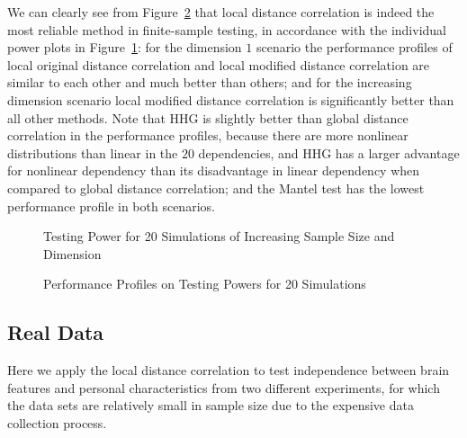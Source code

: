 \documentclass[12pt]{article}
\begin{document}
We can clearly see from Figure~\ref{figSim3} that local distance correlation is indeed the most reliable method in finite-sample testing, in accordance with the individual power plots in Figure~\ref{figSim1}: for the dimension $1$ scenario the performance profiles of local original distance correlation and local modified distance correlation are similar to each other and much better than others; and for the increasing dimension scenario local modified distance correlation is significantly better than all other methods. Note that HHG is slightly better than global distance correlation in the performance profiles, because there are more nonlinear distributions than linear in the $20$ dependencies, and HHG has a larger advantage for nonlinear dependency than its disadvantage in linear dependency when compared to global distance correlation; and the Mantel test has the lowest performance profile in both scenarios.

\begin{figure}[htbp]
\hfil
{}
\caption{Testing Power for 20 Simulations of Increasing Sample Size and Dimension}
\label{figSim1}
\end{figure}

\begin{comment}
\begin{figure}[htbp]
\subfloat[]{
\texttt{[image: Fig2]}
}
\hfil
\subfloat[]{
\texttt{[image: Fig6]}
}
\caption{Testing Power for 20 Simulations of Increasing Neighborhood at Fixed Sample Size and Dimension}
\label{figSim2}
\end{figure}
\end{comment}

\begin{figure}[htbp]
\hfil
{}
\caption{Performance Profiles on Testing Powers for 20 Simulations}
\label{figSim3}
\end{figure}

\subsection{Real Data}
\label{numer2}
Here we apply the local distance correlation to test independence between brain features and personal characteristics from two different experiments, for which the data sets are relatively small in sample size due to the expensive data collection process. 
\end{document}
